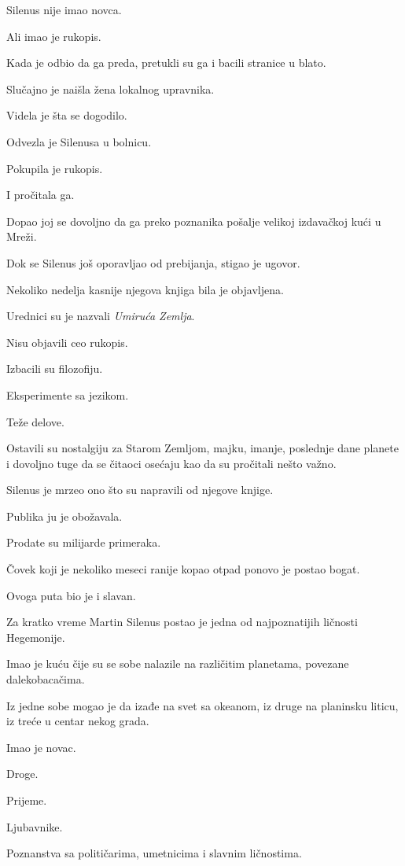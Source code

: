 Silenus nije imao novca.

Ali imao je rukopis.

Kada je odbio da ga preda, pretukli su ga i bacili stranice u blato.

Slučajno je naišla žena lokalnog upravnika.

Videla je šta se dogodilo.

Odvezla je Silenusa u bolnicu.

Pokupila je rukopis.

I pročitala ga.

Dopao joj se dovoljno da ga preko poznanika pošalje velikoj izdavačkoj kući u Mreži.

Dok se Silenus još oporavljao od prebijanja, stigao je ugovor.

Nekoliko nedelja kasnije njegova knjiga bila je objavljena.

Urednici su je nazvali \emph{Umiruća Zemlja}.

Nisu objavili ceo rukopis.

Izbacili su filozofiju.

Eksperimente sa jezikom.

Teže delove.

Ostavili su nostalgiju za Starom Zemljom, majku, imanje, poslednje dane planete i dovoljno tuge da se čitaoci osećaju kao da su pročitali nešto važno.

Silenus je mrzeo ono što su napravili od njegove knjige.

Publika ju je obožavala.

Prodate su milijarde primeraka.

Čovek koji je nekoliko meseci ranije kopao otpad ponovo je postao bogat.

Ovoga puta bio je i slavan.

\bigskip

Za kratko vreme Martin Silenus postao je jedna od najpoznatijih ličnosti Hegemonije.

Imao je kuću čije su se sobe nalazile na različitim planetama, povezane dalekobacačima.

Iz jedne sobe mogao je da izađe na svet sa okeanom, iz druge na planinsku liticu, iz treće u centar nekog grada.

Imao je novac.

Droge.

Prijeme.

Ljubavnike.

Poznanstva sa političarima, umetnicima i slavnim ličnostima.


